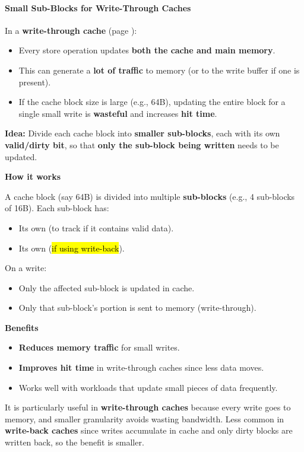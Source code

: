 \paragraph{Small Sub-Blocks for Write-Through Caches}

In a \textbf{write-through cache} (page ):
\begin{itemize}
    \item Every store operation updates \textbf{both the cache and main memory}.
    \item This can generate a \textbf{lot of traffic} to memory (or to the write buffer if one is present).
    \item If the cache block size is large (e.g., 64B), updating the entire block for a single small write is \textbf{wasteful} and increases \textbf{hit time}.
\end{itemize}
\textbf{Idea:} Divide each cache block into \textbf{smaller sub-blocks}, each with its own \textbf{valid/dirty bit}, so that \textbf{only the sub-block being written} needs to be updated.

\highspace
\begin{flushleft}
    \textcolor{Green3}{ \textbf{How it works}}
\end{flushleft}
A cache block (say 64B) is divided into multiple \textbf{sub-blocks} (e.g., 4 sub-blocks of 16B). Each sub-block has:
\begin{itemize}
    \item Its own  (to track if it contains valid data).
    \item Its own  (\hl{if using write-back}).
\end{itemize}
On a write:
\begin{itemize}
    \item Only the affected sub-block is updated in cache.
    \item Only that sub-block's portion is sent to memory (write-through).
\end{itemize}

\highspace
\begin{flushleft}
    \textcolor{Green3}{ \textbf{Benefits}}
\end{flushleft}
\begin{itemize}
    \item[\textcolor{Green3}{\faIcon{check}}] \textbf{Reduces memory traffic} for small writes.
    \item[\textcolor{Green3}{\faIcon{check}}] \textbf{Improves hit time} in write-through caches since less data moves.
    \item[\textcolor{Green3}{\faIcon{check}}] Works well with workloads that update small pieces of data frequently.
\end{itemize}
It is particularly useful in \textbf{write-through caches} because every write goes to memory, and smaller granularity avoids wasting bandwidth. Less common in \textbf{write-back caches} since writes accumulate in cache and only dirty blocks are written back, so the benefit is smaller.

